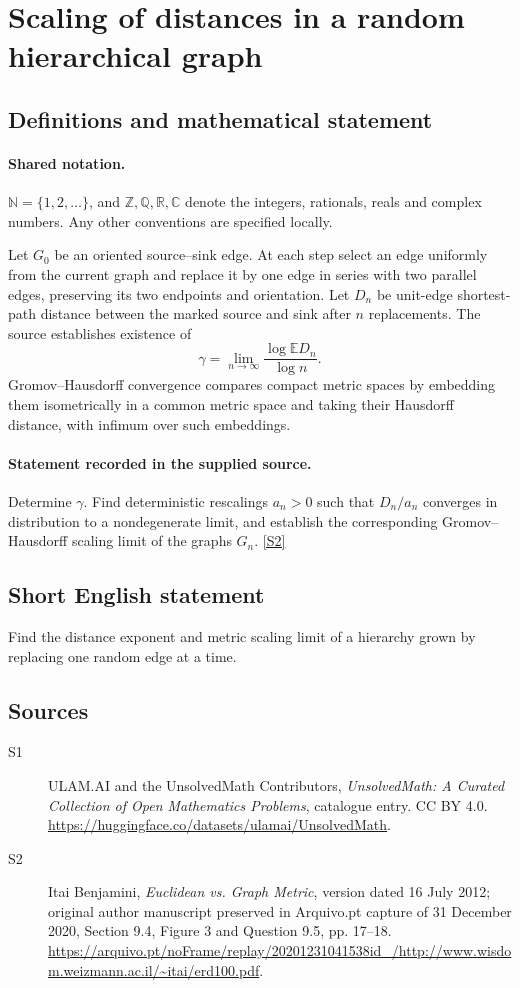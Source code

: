 \documentclass[11pt]{article}
\newcommand{\sref}[2]{\hyperlink{source:#1:#2}{[S#2]}}
\begin{document}
\section{Scaling of distances in a random hierarchical graph}\label{statement}

\subsection{Definitions and mathematical statement}

\paragraph{Shared notation.}$\mathbb N=\{1,2,\ldots\}$, and $\mathbb Z,\mathbb Q,\mathbb R,\mathbb C$ denote the integers, rationals, reals and complex numbers. Any other conventions are specified locally.


Let $G_0$ be an oriented source--sink edge. At each step select an edge uniformly from the current graph and replace it by one edge in series with two parallel edges, preserving its two endpoints and orientation. Let $D_n$ be unit-edge shortest-path distance between the marked source and sink after $n$ replacements. The source establishes existence of
\[\gamma=\lim_{n\to\infty}\frac{\log\mathbb E D_n}{\log n}.\]
Gromov--Hausdorff convergence compares compact metric spaces by embedding them isometrically in a common metric space and taking their Hausdorff distance, with infimum over such embeddings.
\paragraph{Statement recorded in the supplied source.}
Determine $\gamma$. Find deterministic rescalings $a_n>0$ such that $D_n/a_n$ converges in distribution to a nondegenerate limit, and establish the corresponding Gromov--Hausdorff scaling limit of the graphs $G_n$. \sref{statement}{2}
\subsection{Short English statement}
Find the distance exponent and metric scaling limit of a hierarchy grown by replacing one random edge at a time.
\subsection{Sources}
\begin{description}
\item[\hypertarget{source:statement:1}{S1}] ULAM.AI and the UnsolvedMath Contributors, \emph{UnsolvedMath: A Curated Collection of Open Mathematics Problems}, catalogue entry. CC BY 4.0. \url{https://huggingface.co/datasets/ulamai/UnsolvedMath}.
\item[\hypertarget{source:statement:2}{S2}] Itai Benjamini, \emph{Euclidean vs. Graph Metric}, version dated 16 July 2012; original author manuscript preserved in Arquivo.pt capture of 31 December 2020, Section 9.4, Figure 3 and Question 9.5, pp. 17--18. \url{https://arquivo.pt/noFrame/replay/20201231041538id_/http://www.wisdom.weizmann.ac.il/~itai/erd100.pdf}.
\end{description}
\label{end:statement}
\end{document}
